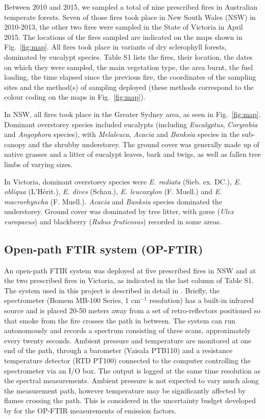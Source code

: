 \documentclass[acp, manuscript]{copernicus}
\begin{document}
Between 2010 and 2015, we sampled a total of nine prescribed fires in Australian temperate forests. Seven of those fires took place in New South Wales (NSW) in 2010-2013, the other two fires were sampled in the State of Victoria in April 2015. The locations of the fires sampled are indicated on the maps shown in Fig.~\ref{fig:map}. All fires took place in variants of dry sclerophyll forests, dominated by eucalypt species. Table S1 lists the fires, their location, the dates on which they were sampled, the main vegetation type, the area burnt, the fuel loading, the time elapsed since the previous fire, the coordinates of the sampling sites and the method(s) of sampling deployed (these methods correspond to the colour coding on the maps in Fig.~\ref{fig:map}). 

In NSW, all fires took place in the Greater Sydney area, as seen in Fig.~\ref{fig:map}. Dominant overstorey species included eucalypts (including \textit{Eucalyptus}, \textit{Corymbia} and \textit{Angophora} species), with \textit{Melaleuca}, \textit{Acacia} and \textit{Banksia} species in the sub-canopy and the shrubby understorey. The ground cover was generally made up of native grasses and a litter of eucalypt leaves, bark and twigs, as well as fallen tree limbs of varying sizes.
 
In Victoria, dominant overstorey species were \textit{E. radiata} (Sieb. ex. DC.), \textit{E. obliqua} (L'H\'erit.), \textit{E. dives} (Schau.), \textit{E. leucoxylon} (F. Muell.) 
and \textit{E. macrorhyncha} (F. Muell.). \textit{Acacia} and \textit{Banksia} species dominated the understorey. Ground cover was dominated by tree litter, with gorse (\textit{Ulex europaeus}) and blackberry (\textit{Rubus fruticosus}) recorded in some areas.


\subsection{Open-path FTIR system (OP-FTIR)}


An open-path FTIR system was deployed at five prescribed fires in NSW and at the two prescribed fires in Victoria, as indicated in the last column of Table S1. The system used in this project is described in detail in \citet{Paton-Walsh2014}. Briefly, the spectrometer (Bomem MB-100 Series, 1 cm$^{-1}$ resolution) has a built-in infrared source and is placed 20-50 meters away from a set of retro-reflectors positioned so that smoke from the fire crosses the path in between. The system can run autonomously and records a spectrum consisting of three scans, approximately every twenty seconds. Ambient pressure and temperature are monitored at one end of the path, through a barometer (Vaisala PTB110) and a resistance temperature detector (RTD PT100) connected to the computer controlling the spectrometer via an I/O box. The output is logged at the same time resolution as the spectral measurements. 
Ambient pressure is not expected to vary much along the measurement path, however temperature may be significantly affected by flames crossing the path. This is considered in the uncertainty budget developed by \citet{Paton-Walsh2014} for the OP-FTIR measurements of emission factors.  
\end{document}
